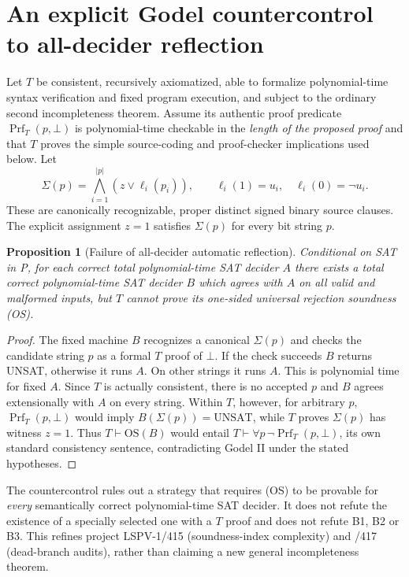 \documentclass[11pt]{article}
\newtheorem{proposition}{Proposition}
\begin{document}
\section{An explicit Godel countercontrol to all-decider reflection}
Let $T$ be consistent, recursively axiomatized, able to formalize polynomial-time syntax verification and fixed program execution, and subject to the ordinary second incompleteness theorem. Assume its authentic proof predicate $\operatorname{Prf}_T(p,\bot)$ is polynomial-time checkable in the \emph{length of the proposed proof} and that $T$ proves the simple source-coding and proof-checker implications used below. Let
\[
\Sigma(p)=\bigwedge_{i=1}^{|p|}(z\vee \ell_i(p_i)),\qquad
\ell_i(1)=u_i,\quad \ell_i(0)=\neg u_i.
\]
These are canonically recognizable, proper distinct signed binary source clauses. The explicit assignment $z=1$ satisfies $\Sigma(p)$ for every bit string $p$.

\begin{proposition}[Failure of all-decider automatic reflection]
Conditional on SAT in P, for each correct total polynomial-time SAT decider $A$ there exists a total correct polynomial-time SAT decider $B$ which agrees with $A$ on \emph{all} valid and malformed inputs, but $T$ cannot prove its one-sided universal rejection soundness (OS).
\end{proposition}
\begin{proof}
The fixed machine $B$ recognizes a canonical $\Sigma(p)$ and checks the candidate string $p$ as a formal $T$ proof of $\bot$. If the check succeeds $B$ returns UNSAT, otherwise it runs $A$. On other strings it runs $A$. This is polynomial time for fixed $A$. Since $T$ is actually consistent, there is no accepted $p$ and $B$ agrees extensionally with $A$ on every string. Within $T$, however, for arbitrary $p$, $\operatorname{Prf}_T(p,\bot)$ would imply $B(\Sigma(p))=\mathrm{UNSAT}$, while $T$ proves $\Sigma(p)$ has witness $z=1$. Thus $T\vdash\mathrm{OS}(B)$ would entail $T\vdash \forall p\,\neg\operatorname{Prf}_T(p,\bot)$, its own standard consistency sentence, contradicting Godel II under the stated hypotheses.
\end{proof}
The countercontrol rules out a strategy that requires (OS) to be provable for \emph{every} semantically correct polynomial-time SAT decider. It does not refute the existence of a specially selected one with a $T$ proof and does not refute B1, B2 or B3. This refines project LSPV-1/415 (soundness-index complexity) and /417 (dead-branch audits), rather than claiming a new general incompleteness theorem.
\end{document}
